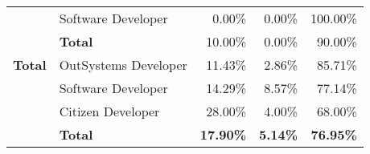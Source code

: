 \begin{table}[tb]
\begin{tabular}{llrrr}
                            & Software Developer   & 0.00\%                                                            & 0.00\%                                                                  & 100.00\%                                                      \\
                            & \textbf{Total}       & 10.00\%                                                           & 0.00\%                                                                  & 90.00\%                                                       \\ \hline
  \rowcolor[HTML]{EFEFEF} 
  \textbf{Total}            & OutSystems Developer & 11.43\%                                                           & 2.86\%                                                                  & 85.71\%                                                       \\
  \rowcolor[HTML]{EFEFEF} 
                            & Software Developer   & 14.29\%                                                           & 8.57\%                                                                  & 77.14\%                                                       \\
  \rowcolor[HTML]{EFEFEF} 
                            & Citizen Developer    & 28.00\%                                                           & 4.00\%                                                                  & 68.00\%                                                       \\
  \rowcolor[HTML]{EFEFEF} 
                            & \textbf{Total}       & \textbf{17.90\%}                                                  & \textbf{5.14\%}                                                         & \textbf{76.95\%}                                              \\ \hline
  \end{tabular}
  \end{table}


